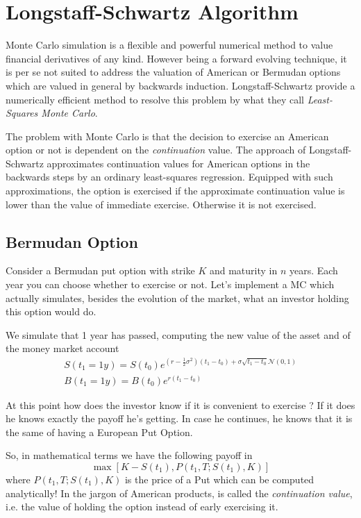 \documentclass[12pt,a4paper]{book}
\begin{document}
\section{Longstaff-Schwartz Algorithm}

Monte Carlo simulation is a flexible and powerful numerical method to value financial derivatives of any kind. However being a forward evolving technique, it is per se not suited to address the valuation of American or Bermudan options which are valued in general by backwards induction. Longstaff-Schwartz provide a numerically efficient method to resolve this problem by what they call \emph{Least-Squares Monte Carlo}.

The problem with Monte Carlo is that the decision to exercise an American option or not is dependent on the \emph{continuation} value. %
The approach of Longstaff-Schwartz approximates continuation values for American options in the backwards steps by an ordinary least-squares regression.
Equipped with such approximations, the option is exercised if the approximate continuation value is lower than the value of immediate exercise. Otherwise it is not exercised.

\subsection{Bermudan Option}
Consider a Bermudan put option with strike $K$ and maturity in $n$ years. Each year you can choose whether to exercise or not.
Let's implement a MC which actually simulates, besides the evolution of the market, what an investor holding this option would do. 

We simulate that 1 year has passed, computing the new value of the asset and of the money market account
\begin{equation}
	\begin{gathered}
		S(t_1=1y) = S(t_0)e^{(r-\frac{1}{2}\sigma^2)(t_1-t_0)+\sigma\sqrt{t_1-t_0}\mathcal{N}(0,1)} \\
		B(t_1=1y)=B(t_0)e^{r(t_1-t_0)}
	\end{gathered}
\end{equation}

At this point how does the investor know if it is convenient to exercise ? 
If it does he knows exactly the payoff he's getting. In case he continues, he knows that it is the same of having a European Put Option.

So, in mathematical terms we have the following payoff in 
\begin{equation}
	\max[K-S(t_1), P(t_1,T;S(t_1),K)]
\end{equation}
where $P(t_1,T;S(t_1),K)$ is the price of a Put which can be computed analytically! In the jargon of American products, 
is called the \emph{continuation value}, i.e. the value of holding the option instead of early exercising it.
\end{document}
